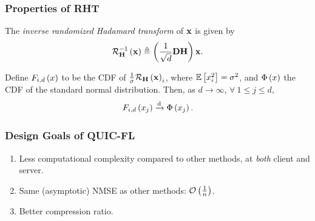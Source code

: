 \documentclass{beamer}
\begin{document}
    \begin{frame}
        \frametitle{Properties of RHT}
        \begin{definition}
            The \emph{inverse randomized Hadamard transform} of \(\boldsymbol{\mathbf{x}}\) is given by
            \begin{equation}
                \mathcal R_{\boldsymbol{\mathbf{H}}}^{-1}\left(\boldsymbol{\mathbf{x}}\right) \triangleq \left(\frac{1}{\sqrt{d}}\boldsymbol{\mathbf{DH}}\right)\boldsymbol{\mathbf{x}}.
                \label{eq:inv-rht-def}
            \end{equation}
        \end{definition}
        \begin{lemma}
            \label{lem:rht-norm-conv}
            Define \(F_{i,d}\left(x\right)\) to be the CDF of
            \(\frac{1}{\sigma}\mathcal R_{\boldsymbol{\mathbf{H}}}\left(\boldsymbol{\mathbf{x}}\right)_i\), where
            \(\mathbb{E}\left[ x_i^2 \right] = \sigma^2\), and \(\Phi\left(x\right)\) the CDF of the
            standard normal distribution. Then, as \(d\to\infty\), \(\forall\ 1
            \le j \le d\), 
            \begin{equation}
                F_{i,d}\left(x_j\right) \xrightarrow{\mathrm{d}} \Phi\left(x_j\right).
                \label{eq:rht-norm-conv}
            \end{equation}
        \end{lemma}
    \end{frame}

    \begin{frame}
        \frametitle{Design Goals of QUIC-FL}
        \begin{enumerate}
            \item Less computational complexity compared to other methods, at
            \emph{both} client and server.
            \item Same (asymptotic) NMSE as other methods: \(\mathcal O\left(\frac{1}{n}\right)\).
            \item Better compression ratio.
        \end{enumerate}
    \end{frame}
\end{document}
